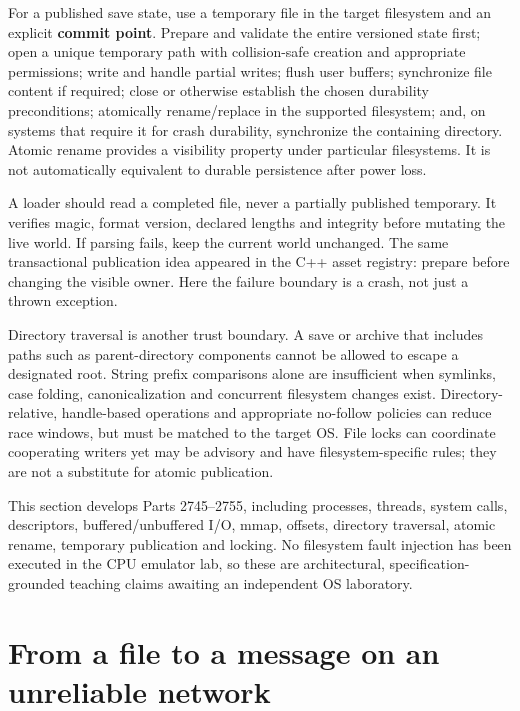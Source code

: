 For a published save state, use a temporary file in the target filesystem and an explicit \textbf{commit point}. Prepare and validate the entire versioned state first; open a unique temporary path with collision-safe creation and appropriate permissions; write and handle partial writes; flush user buffers; synchronize file content if required; close or otherwise establish the chosen durability preconditions; atomically rename/replace in the supported filesystem; and, on systems that require it for crash durability, synchronize the containing directory. Atomic rename provides a visibility property under particular filesystems. It is not automatically equivalent to durable persistence after power loss.

A loader should read a completed file, never a partially published temporary. It verifies magic, format version, declared lengths and integrity before mutating the live world. If parsing fails, keep the current world unchanged. The same transactional publication idea appeared in the C++ asset registry: prepare before changing the visible owner. Here the failure boundary is a crash, not just a thrown exception.

Directory traversal is another trust boundary. A save or archive that includes paths such as parent-directory components cannot be allowed to escape a designated root. String prefix comparisons alone are insufficient when symlinks, case folding, canonicalization and concurrent filesystem changes exist. Directory-relative, handle-based operations and appropriate no-follow policies can reduce race windows, but must be matched to the target OS. File locks can coordinate cooperating writers yet may be advisory and have filesystem-specific rules; they are not a substitute for atomic publication.

This section develops Parts 2745--2755, including processes, threads, system calls, descriptors, buffered/unbuffered I/O, mmap, offsets, directory traversal, atomic rename, temporary publication and locking. No filesystem fault injection has been executed in the CPU emulator lab, so these are architectural, specification-grounded teaching claims awaiting an independent OS laboratory.

\section{From a file to a message on an unreliable network}\label{01-foundations-i-ch016-from-a-file-to-a-message-on-an-unreliable-network}

